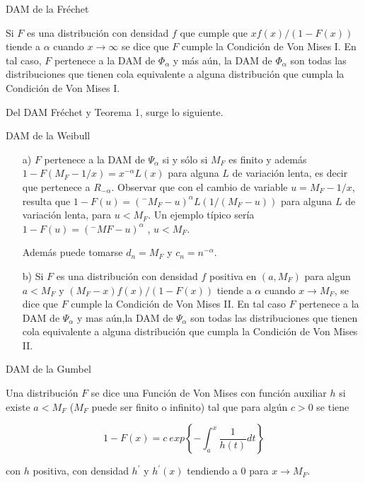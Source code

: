 \documentclass[
  12pt]{article}
\begin{document}
\begin{Corolario} DAM de la Fréchet

Si $F$ es una distribución con densidad $f$ que cumple que $xf(x)/(1-F(x))$ tiende a $\alpha$ cuando $x\rightarrow \infty$ se dice que $F$ cumple la Condición de Von Mises I. En tal caso, $F$ pertenece a la DAM de $\Phi_{\alpha}$ y más aún, la DAM de $\Phi_{\alpha}$ son todas las distribuciones que tienen cola equivalente a alguna distribución que cumpla la Condición de Von Mises I.
\end{Corolario}

Del DAM Fréchet y Teorema 1, surge lo siguiente.

\begin{theorem} DAM de la Weibull

\begin{itemize}
\item[a)] $F$ pertenece a la DAM de $\Psi_{\alpha}$ si y sólo si $M_F$ es finito y además $1-F(M_F -1/x)=x^{-\alpha}L(x)$ para alguna $L$ de variación lenta, es decir que pertenece a $R_{-\alpha}$. Observar que con el cambio de variable $u=M_F -1/x$,
resulta que $1-F(u)=(^{-}M_F -u)^{\alpha} L(1/(M_F -u))$ para alguna $L$ de variación lenta, para $u< M_F$. Un ejemplo típico sería $1-F(u)=(^{-}MF -u)^{\alpha}$ , $u< M_F$. 

Además puede tomarse $d_n= M_F$ y $c_n= n^{-\alpha}$.

\item[b)] Si $F$ es una distribución con densidad $f$ positiva en $(a,M_F)$ para algun $a< M_F$ y $(M_F -x)f(x)/(1-F(x))$ tiende a $\alpha$ cuando $x\rightarrow M_F$, se dice que $F$ cumple la Condición de Von Mises II. En tal caso $F$ pertenece a la DAM de $\Psi_{\alpha}$ y mas aún,la DAM de $\Psi_{\alpha}$ son todas las distribuciones que tienen cola equivalente a alguna distribución que cumpla la Condición de Von Mises II.
\end{itemize}
\end{theorem}

\begin{theorem} DAM de la Gumbel

Una distribución $F$ se dice una Función de Von Mises con función auxiliar $h$ si existe $a < M_F$ ($M_F$ puede ser finito o infinito) tal que para algún $c>0$ se tiene

$$
1-F(x)=c\:exp\left \{  - \int_a^x \frac{1}{h(t)} dt \right \}
$$

con $h$ positiva, con densidad $h^{\prime}$ y $h^{\prime}(x)$ tendiendo a $0$ para $x \rightarrow M_F$.
\end{theorem}
\end{document}
